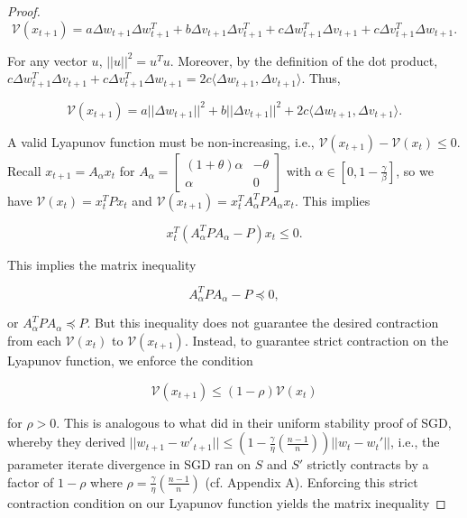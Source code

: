 \documentclass[twoside,11pt]{article}
\begin{document}
\begin{proof}
\begin{equation}
\mathcal{V}(x_{t+1}) = a \Delta w_{t+1} \Delta w^T_{t+1} + b \Delta v_{t+1} \Delta v^T_{t+1} + c \Delta w^T_{t+1} \Delta v_{t+1} + c \Delta v_{t+1}^T \Delta w_{t+1}.
\end{equation}

\noindent
For any vector $u$, $||u||^2 = u^T u$. Moreover, by the definition of the dot product, $c \Delta w^T_{t+1} \Delta v_{t+1} + c \Delta v_{t+1}^T \Delta w_{t+1} = 2c \langle \Delta w_{t+1}, \Delta v_{t+1} \rangle$. Thus,

\begin{equation}
\mathcal{V}(x_{t+1}) = a||\Delta w_{t+1}||^2 + b||\Delta v_{t+1}||^2 + 2c\langle \Delta w_{t+1}, \Delta v_{t+1} \rangle.
\end{equation}

\noindent
A valid Lyapunov function must be non-increasing, i.e., $\mathcal{V}(x_{t+1}) - \mathcal{V}(x_t) \leq 0$. Recall $x_{t+1} = A_{\alpha}x_t$ for $A_{\alpha} = \begin{bmatrix}
    (1+\theta)\alpha & -\theta \\
    \alpha & 0
\end{bmatrix}$ with $\alpha \in [0, 1-\frac{\gamma}{\beta}]$, so we have $\mathcal{V}(x_t) = x_t^TPx_t$ and $\mathcal{V}(x_{t+1}) = x_t^TA_{\alpha}^TPA_{\alpha}x_t$. This implies

\begin{equation}
x_t^T(A_{\alpha}^TPA_{\alpha}-P)x_t \leq 0.
\end{equation}

\noindent
This implies the matrix inequality

\begin{equation}
A_{\alpha}^TPA_{\alpha}-P \preceq 0,
\end{equation}

\noindent
or $A_{\alpha}^TPA_{\alpha} \preceq P$. But this inequality does not guarantee the desired contraction from each $\mathcal{V}(x_t)$ to $\mathcal{V}(x_{t+1})$. Instead, to guarantee strict contraction on the Lyapunov function, we enforce the condition

\begin{equation}
\mathcal{V}(x_{t+1}) \leq (1-\rho)\mathcal{V}(x_t)
\end{equation}

\noindent
for $\rho > 0$. This is analogous to what \cite{HRS16} did in their uniform stability proof of SGD, whereby they derived $||w_{t+1} - w'_{t+1}|| \leq (1- \frac{\gamma}{\eta}(\frac{n-1}{n}))||w_t - w_t'||$, i.e., the parameter iterate divergence in SGD ran on $S$ and $S'$ strictly contracts by a factor of $1-\rho$ where $\rho = \frac{\gamma}{\eta}(\frac{n-1}{n})$ (cf. Appendix A). Enforcing this strict contraction condition on our Lyapunov function yields the matrix inequality


\end{proof}
\end{document}
